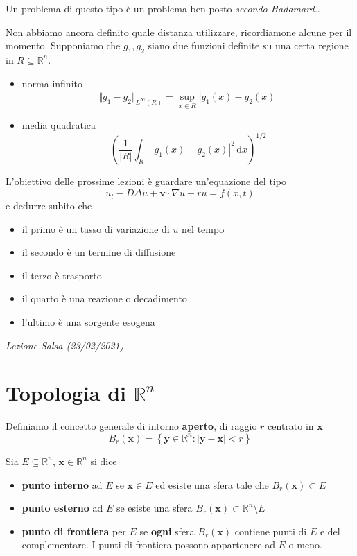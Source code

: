\documentclass[10pt,a4paper,twoside,openright]{book}
\newcounter{conteggioS}
\newcommand{\LezioneS}[1]{
	\stepcounter{conteggioS}
	\textit{Lezione Salsa \arabic{conteggioS} (#1)}
	}
\newcommand{\x}{\mathbf{x}}
\newcommand{\y}{\mathbf{y}}
\newcommand{\de}{\,\mathrm d}
\newcommand{\dx}{\de x}
\begin{document}
Un problema di questo tipo è un problema ben posto \textit{secondo Hadamard.}.

Non abbiamo ancora definito quale distanza utilizzare, ricordiamone alcune per il momento. Supponiamo che $g_{1},g_{2}$ siano due funzioni definite su una certa regione in $R\subseteq \mathbb{R}^{n}$.
\begin{itemize}
    \item norma infinito
          \begin{equation*}
              \Vert g_{1} -g_{2}\Vert _{L^{\infty }(R)} =\sup _{x\in R}| g_{1}(x) -g_{2}(x)|
          \end{equation*}
    \item media quadratica
          \begin{equation*}
              \left(\frac{1}{| R| }\int _{R}| g_{1}(x) -g_{2}(x)| ^{2} \dx\right)^{1/2}
          \end{equation*}
\end{itemize}

L'obiettivo delle prossime lezioni è guardare un'equazione del tipo
\begin{equation*}
    u_{t} -D\Delta u+\mathbf{v} \cdotp \nabla u+ru=f(x,t)
\end{equation*}
e dedurre subito che
\begin{itemize}
    \item il primo è un tasso di variazione di $u$ nel tempo
    \item il secondo è un termine di diffusione
    \item il terzo è trasporto
    \item il quarto è una reazione o decadimento
    \item l'ultimo è una sorgente esogena
\end{itemize}

\LezioneS{23/02/2021}
\section{Topologia di \texorpdfstring{$\mathbb{R}^{n}$}{Rn}}
\begin{definition}
     Definiamo il concetto generale di intorno \textbf{aperto}, di raggio $r$ centrato in $\x$
    \begin{equation*}
        B_{r}(\x) =\left\{\y\in \mathbb{R}^{n} :| \y-\x| < r\right\}
    \end{equation*}
\end{definition}
Sia $E\subseteq \mathbb{R}^{n}$, $\x\in \mathbb{R}^{n}$ si dice
\begin{itemize}
    \item \textbf{punto interno} ad $E$ se $\x\in E$ ed esiste una sfera tale che $B_{r}(\x) \subset E$
    \item \textbf{punto esterno} ad $E$ se esiste una sfera $B_{r}(\x) \subset \mathbb{R}^{n} \setminus E$
    \item \textbf{punto di frontiera} per $E$ se \textbf{ogni} sfera $B_{r}(\x)$ contiene punti di $E$ e del complementare. I punti di frontiera possono appartenere ad $E$ o meno.
\end{itemize}
\end{document}
